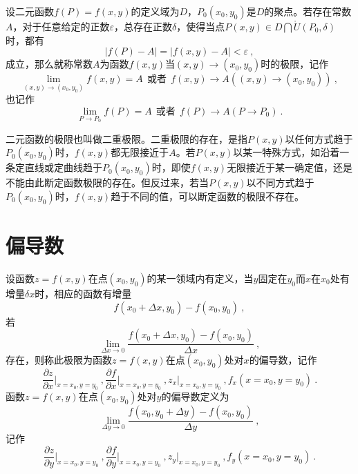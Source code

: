 \documentclass[12pt,a4paper]{article}
\begin{document}
\begin{tcolorbox}[colback=green!15,colframe=green!40!black,title= 定义]
设二元函数$f(P) = f(x, y)$的定义域为$D$，$P_0(x_0, y_0)$是$D$的聚点。若存在常数$A$，对于任意给定的正数$\varepsilon$，总存在正数$\delta$，使得当点$P(x, y) \in D \bigcap \mathring{U}(P_0, \delta)$时，都有
\begin{equation*}
|f(P) - A| = |f(x, y) - A | < \varepsilon ~,
\end{equation*}
成立，那么就称常数$A$为函数$f(x, y)$当$(x, y) \rightarrow (x_0, y_0)$时的极限，记作
\begin{equation*}
\lim_{(x,y) \rightarrow (x_0, y_0)} f(x, y) = A  ~~\text{或者}  ~~ f(x, y) \rightarrow A( (x, y) \rightarrow (x_0, y_0) ) ~,
\end{equation*}
也记作
\begin{equation*}
\lim_{P \rightarrow P_0} f(P) = A  ~~\text{或者}  ~~ f(P) \rightarrow A( P \rightarrow P_0 ) ~.
\end{equation*}
\end{tcolorbox}
二元函数的极限也叫做二重极限。二重极限的存在，是指$P(x, y)$以任何方式趋于$P_0(x_0, y_0)$时，$f(x, y)$都无限接近于$A$。若$P(x, y)$以某一特殊方式，如沿着一条定直线或定曲线趋于$P_0(x_0, y_0)$时，即使$f(x, y)$无限接近于某一确定值，还是不能由此断定函数极限的存在。但反过来，若当$P(x, y)$以不同方式趋于$P_0(x_0, y_0)$时，$f(x, y)$趋于不同的值，可以断定函数的极限不存在。



\section{偏导数}
\begin{tcolorbox}[colback=green!15,colframe=green!40!black,title= 定义]
设函数$z = f(x, y)$在点$(x_0, y_0)$的某一领域内有定义，当$y$固定在$y_0$而$x$在$x_0$处有增量$\delta x$时，相应的函数有增量
\begin{equation*}
f(x_0 +\Delta x, y_0) - f(x_0, y_0) ~,
\end{equation*}
若
\begin{equation*}
\lim_{\Delta x \rightarrow 0} \dfrac{f(x_0 +\Delta x, y_0) - f(x_0, y_0)}{\Delta x} ~,
\end{equation*}
存在，则称此极限为函数$z=f(x,y)$在点$(x_0, y_0)$处对$x$的偏导数，记作
\begin{equation*}
\dfrac{\partial z}{\partial x} \Bigg|_{x=x_0, y=y_0} ~, \dfrac{\partial f}{\partial x} \Bigg|_{x=x_0, y=y_0} ~, z_x \Big|_{x=x_0, y=y_0} ~, f_x (x=x_0, y=y_0) ~.
\end{equation*}
函数$z = f(x, y)$在点$(x_0, y_0)$处对$y$的偏导数定义为
\begin{equation}
\lim_{\Delta y \rightarrow 0} \dfrac{f(x_0, y_0 +\Delta y) - f(x_0, y_0)}{\Delta y} ~,
\end{equation}
记作
\begin{equation*}
\dfrac{\partial z}{\partial y} \Bigg|_{x=x_0, y=y_0} ~, \dfrac{\partial f}{\partial y} \Bigg|_{x=x_0, y=y_0} ~, z_y \Big|_{x=x_0, y=y_0} ~, f_y (x=x_0, y=y_0) ~.
\end{equation*}
\end{tcolorbox}
\end{document}
